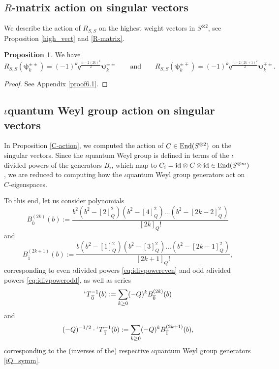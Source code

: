 \documentclass[10pt]{amsart}
\numberwithin{equation}{section}
\theoremstyle{definition}
\newtheorem{proposition}[theorem]{Proposition}
\newcommand{\End}{{\rm End}}
\newcommand{\id}{{\rm id}}
\newcommand{\ot}{\otimes}
\newcommand{\iQW}{\prescript{\iota}{}{T}}
\newcommand{\hwp}{\boldsymbol{\psi}}
\begin{document}
\subsection{$R$-matrix action on singular vectors}
We describe the action of $R_{S,S}$ on the highest weight vectors in $S^{\ot 2}$, see Proposition \ref{high_vect} and \eqref{R-matrix}.

\begin{proposition}\label{R-action}
    We have
\begin{equation}
    R_{S,S}(\hwp_k^{\pm \pm})=(-1)^kq^{\frac{n-2(2k)^2}{2}} \hwp_k^{\pm \pm} \qquad \text{and} \qquad R_{S,S}(\hwp_k^{\pm \mp})=(-1)^kq^{\frac{n-2(2k+1)^2}{2}} \hwp_k^{\mp \pm}.
\end{equation}
\end{proposition}
\begin{proof}
See Appendix \ref{proof6.1}.
\end{proof}

\subsection{$\iota$quantum Weyl group action on singular vectors}

In Proposition \ref{C-action}, we computed the action of $C\in \End(S^{\otimes 2})$ on the singular vectors. Since the $\iota$quantum Weyl group is defined in terms of the $\iota$divided powers of the generators $B_i$, which map to $C_i=\id\otimes C\otimes \id\in \End(S^{\otimes m})$, we are reduced to computing how the $\iota$quantum Weyl group generators act on $C$-eigenspaces. 

To this end, let us consider polynomials
\begin{equation}\label{eq:evendivpowerpoly}
    B_{\overline{0}}^{(2k)}(b):=\frac{b^{2}(b^2-[2]_Q^2)(b^2-[4]_Q^2)\dots (b^2-[2k-2]^2_Q)}{[2k]_Q!}
\end{equation}
and
\begin{equation}\label{eq:odddivpowerpoly}
    B_{\overline{1}}^{(2k+1)}(b):=\frac{b(b^2-[1]_Q^2)(b^2-[3]_Q^2)\dots (b^2-[2k-1]^2_Q)}{[2k+1]_Q!},
\end{equation}
corresponding to even $\iota$divided powers \eqref{eq:idivpowereven} and odd $\iota$divided powers \eqref{eq:idivpowerodd}, as well as series
\begin{equation}\label{eq:evenseries}
    \iQW^{-1}_{\overline{0}}(b):=\sum_{k\ge 0} (-Q)^kB_{\overline{0}}^{(2k)}(b)
\end{equation}
and
\begin{equation}\label{eq:oddseries}
    (-Q)^{-1/2}\cdot \iQW_{\overline{1}}^{-1}(b):=\sum_{k\ge 0} (-Q)^k B_{\overline{1}}^{(2k+1)}(b),
\end{equation}
corresponding to the (inverses of the) respective $\iota$quantum Weyl group generators \eqref{iQ_symm}.
\end{document}
